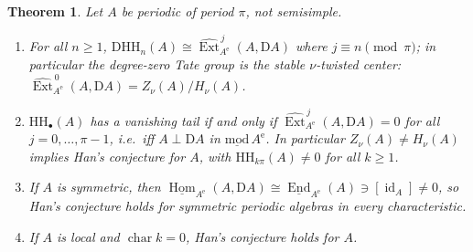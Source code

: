 \documentclass[11pt]{amsart}
\newtheorem{theorem}{Theorem}[section]
\theoremstyle{definition}
\newcommand{\HH}{\mathrm{HH}}
\newcommand{\D}{\mathrm{D}}
\newcommand{\sExt}{\widehat{\operatorname{Ext}}}
\newcommand{\sHom}{\underline{\operatorname{Hom}}}
\newcommand{\sEnd}{\underline{\operatorname{End}}}
\newcommand{\id}{\operatorname{id}}
\newcommand{\Ae}{A^{\mathrm{e}}}
\newcommand{\kk}{k}
\begin{document}
\begin{theorem}\label{thm:periodic}
Let $A$ be periodic of period $\pi$, not semisimple.
\begin{enumerate}
\item For all $n\ge1$,
$\D\HH_n(A)\cong\sExt^{\,j}_{\Ae}(A,\D A)$ where $j\equiv n\pmod\pi$; in
particular the degree-zero Tate group is the stable $\nu$-twisted center:
$\sExt^{\,0}_{\Ae}(A,\D A)=Z_\nu(A)/H_\nu(A)$.
\item $\HH_\bullet(A)$ has a vanishing tail if and only if
$\sExt^{\,j}_{\Ae}(A,\D A)=0$ for \emph{all} $j=0,\dots,\pi-1$, i.e.\ iff
$A\perp\D A$ in $\underline{\mathrm{mod}}\,\Ae$. In particular
$Z_\nu(A)\neq H_\nu(A)$ implies Han's conjecture for $A$, with
$\HH_{k\pi}(A)\neq0$ for all $k\ge1$.
\item If $A$ is symmetric, then
$\sHom_{\Ae}(A,\D A)\cong\sEnd_{\Ae}(A)\ni[\id_A]\neq0$, so Han's conjecture
holds for symmetric periodic algebras in every characteristic.
\item If $A$ is local and $\operatorname{char}\kk=0$, Han's conjecture holds
for $A$.
\end{enumerate}
\end{theorem}
\end{document}
